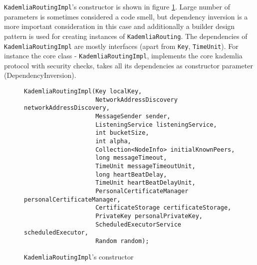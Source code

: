 {\texttt{KademliaRoutingImpl}'s constructor} is shown in figure \ref{fig:routing_constr_header}.
Large number of parameters is sometimes considered a code smell, but dependency inversion is a more important consideration in this case and additionally a builder design pattern is used for creating instances of \texttt{KademliaRouting}.
The dependencies of \texttt{KademliaRoutingImpl} are mostly interfaces (apart from \texttt{Key}, \texttt{TimeUnit}).
For instance the core class - \texttt{KademliaRoutingImpl}, implements the core kademlia protocol with security checks, takes all its dependencies as constructor parameter (DependencyInversion).

\begin{figure}[tbp]
\begin{lstlisting}
KademliaRoutingImpl(Key localKey,
                    NetworkAddressDiscovery networkAddressDiscovery,
                    MessageSender sender,
                    ListeningService listeningService,
                    int bucketSize,
                    int alpha,
                    Collection<NodeInfo> initialKnownPeers,
                    long messageTimeout,
                    TimeUnit messageTimeoutUnit,
                    long heartBeatDelay,
                    TimeUnit heartBeatDelayUnit,
                    PersonalCertificateManager personalCertificateManager,
                    CertificateStorage certificateStorage,
                    PrivateKey personalPrivateKey,
                    ScheduledExecutorService scheduledExecutor,
                    Random random);
\end{lstlisting}
\caption{\texttt{KademliaRoutingImpl}'s constructor}
\label{fig:routing_constr_header}
\end{figure}
